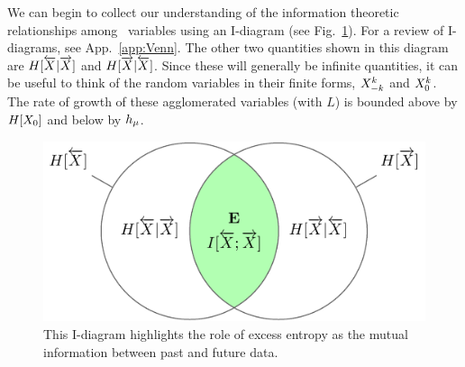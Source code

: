 We can begin to collect our understanding of the information theoretic relationships among \eM\ variables using an I-diagram (see Fig.~\ref{fig:2var_IXYisE}). For a review of I-diagrams, see App.~\ref{app:Venn}. The other two quantities shown in this diagram are $H[\smash{\overleftarrow {{X}}} | \smash{\overrightarrow{{X}}}]$ and $H[\smash{\overrightarrow{{X}}} | \smash{\overleftarrow {{X}}}]$. Since these will generally be infinite quantities, it can be useful to think of the random variables in their finite forms, ${X}_{-k}^k$ and ${X}_0^k$. The rate of growth of these agglomerated variables (with $L$) is bounded above by $H[{X}_0]$ and below by $h_\mu$.
\begin{figure}[h!]
\centering
\includegraphics{../chapter1/figures/tikz/2var_IXYisE}
\caption{This I-diagram highlights the role of excess entropy as the mutual information between past and future data.}
\label{fig:2var_IXYisE}
\end{figure}

